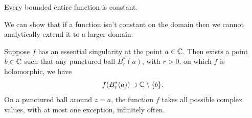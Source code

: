 \documentclass[11pt, a4paper]{article}
\begin{document}
\begin{thmbox}
    Every bounded entire function is constant.
\end{thmbox}

\begin{warnbox}
    We can show that if a function isn't constant on the domain then we cannot analytically extend it to a larger domain. 
\end{warnbox}

\begin{thmbox}
    Suppose $f$ has an essential singularity at the point $a \in \mathbb{C}$.
    Then exists a point $b \in \mathbb{C}$ such that any punctured ball $B_{r}^{*}(a)$,
    with $r > 0$,
    on which $f$ is holomorphic,
    we have
    \[
    f(B_{r}^{*}(a)) \supset \mathbb{C} \setminus \{b\}.
    \]
    On a punctured ball around $z = a$,
    the function $f$ takes all possible complex values,
    with at most one exception,
    infinitely often.
\end{thmbox}
\end{document}
